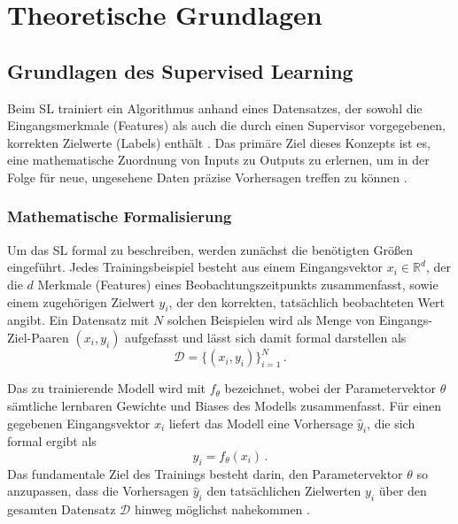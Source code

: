 \section{Theoretische Grundlagen}
\label{sec:theoretische_grundlagen}

\subsection{Grundlagen des Supervised Learning}
\label{sec:sl_grundlagen}

Beim \gls{SL} trainiert ein Algorithmus anhand eines Datensatzes, der sowohl die Eingangsmerkmale (Features) als auch die durch einen Supervisor vorgegebenen, korrekten Zielwerte (Labels) enthält \cite[vgl.~S.~104f.]{chap2_Goo16}. 
Das primäre Ziel dieses Konzepts ist es, eine mathematische Zuordnung von Inputs zu Outputs zu erlernen, um in der Folge für neue, ungesehene Daten präzise Vorhersagen treffen zu können \cite[vgl.~S.~3]{chap2_Mur12}.

\subsubsection{Mathematische Formalisierung}
\label{sec:problemklassifikation_sl}

Um das \gls{SL} formal zu beschreiben, werden zunächst die benötigten Größen eingeführt. 
Jedes Trainingsbeispiel besteht aus einem Eingangsvektor $x_i \in \mathbb{R}^d$, der die $d$ Merkmale (Features) eines Beobachtungszeitpunkts zusammenfasst, sowie einem zugehörigen Zielwert $y_i$, der den korrekten, tatsächlich beobachteten Wert angibt. 
Ein Datensatz mit $N$ solchen Beispielen wird als Menge von Eingangs-Ziel-Paaren $(x_i, y_i)$ aufgefasst und lässt sich damit formal darstellen als
\begin{equation}
    \mathcal{D} = \{(x_i, y_i)\}_{i=1}^N \, .
    \label{eq:sl_datensatz}
\end{equation}

Das zu trainierende Modell wird mit $f_\theta$ bezeichnet, wobei der Parametervektor $\theta$ sämtliche lernbaren Gewichte und Biases des Modells zusammenfasst. 
Für einen gegebenen Eingangsvektor $x_i$ liefert das Modell eine Vorhersage $\hat{y}_i$, die sich formal ergibt als
\begin{equation}
    \hat{y}_i = f_\theta(x_i) \, .
    \label{eq:sl_vorhersage}
\end{equation}
Das fundamentale Ziel des Trainings besteht darin, den Parametervektor $\theta$ so anzupassen, dass die Vorhersagen $\hat{y}_i$ den tatsächlichen Zielwerten $y_i$ über den gesamten Datensatz $\mathcal{D}$ hinweg möglichst nahekommen \cite[vgl.~S.~8f.]{chap2_Ter25}.

